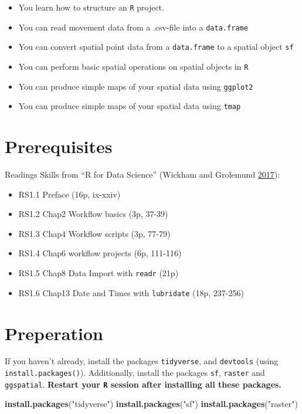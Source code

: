 \documentclass[]{book}
\newenvironment{Shaded}{\begin{snugshade}}{\end{snugshade}}
\newcommand{\KeywordTok}[1]{\textcolor[rgb]{0.13,0.29,0.53}{\textbf{#1}}}
\newcommand{\StringTok}[1]{\textcolor[rgb]{0.31,0.60,0.02}{#1}}
\newcommand{\NormalTok}[1]{#1}
\providecommand{\tightlist}{%
  \setlength{\itemsep}{0pt}\setlength{\parskip}{0pt}}
\begin{document}
\begin{itemize}
\tightlist
\item
  You learn how to structure an \texttt{R} project.
\item
  You can read movement data from a .csv-file into a \texttt{data.frame}
\item
  You can convert spatial point data from a \texttt{data.frame} to a
  spatial object \texttt{sf}
\item
  You can perform basic spatial operations on spatial objects in
  \texttt{R}
\item
  You can produce simple maps of your spatial data using
  \texttt{ggplot2}
\item
  You can produce simple maps of your spatial data using \texttt{tmap}
\end{itemize}

\section{Prerequisites}\label{prerequisites}

Readings Skills from ``R for Data Science'' (Wickham and Grolemund
\protect\hyperlink{ref-wickham2017}{2017}):

\begin{itemize}
\tightlist
\item
  RS1.1 Preface (16p, ix-xxiv)
\item
  RS1.2 Chap2 Workflow basics (3p, 37-39)
\item
  RS1.3 Chap4 Workflow scripts (3p, 77-79)
\item
  RS1.4 Chap6 workflow projects (6p, 111-116)
\item
  RS1.5 Chap8 Data Import with \texttt{readr} (21p)
\item
  RS1.6 Chap13 Date and Times with \texttt{lubridate} (18p, 237-256)
\end{itemize}

\section{Preperation}\label{preperation}

If you haven't already, install the packages \texttt{tidyverse}, and
\texttt{devtools} (using \texttt{install.packages()}). Additionally,
install the packages \texttt{sf}, \texttt{raster} and
\texttt{ggspatial}. \textbf{Restart your \texttt{R} session after
installing all these packages.}

\begin{Shaded}
\begin{Highlighting}[]
\KeywordTok{install.packages}\NormalTok{(}\StringTok{"tidyverse"}\NormalTok{)}
\KeywordTok{install.packages}\NormalTok{(}\StringTok{"sf"}\NormalTok{)}
\KeywordTok{install.packages}\NormalTok{(}\StringTok{"raster"}\NormalTok{)}
\end{Highlighting}
\end{Shaded}
\end{document}
